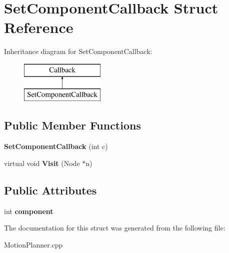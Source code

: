 \section{Set\+Component\+Callback Struct Reference}
\label{structSetComponentCallback}
Inheritance diagram for Set\+Component\+Callback\+:\begin{figure}[H]
\begin{center}
\leavevmode
\includegraphics[height=2.000000cm]{structSetComponentCallback}
\end{center}
\end{figure}
\subsection*{Public Member Functions}
\begin{DoxyCompactItemize}
\item 
{\bfseries Set\+Component\+Callback} (int c)\label{structSetComponentCallback_a0f2ca8f3081e1a3af4720d59f56df9fe}

\item 
virtual void {\bfseries Visit} (Node $\ast$n)\label{structSetComponentCallback_afd8b047454f94a9fc1983969ab7976fe}

\end{DoxyCompactItemize}
\subsection*{Public Attributes}
\begin{DoxyCompactItemize}
\item 
int {\bfseries component}\label{structSetComponentCallback_a544be9719b2ae2aedccf4aed117a6799}

\end{DoxyCompactItemize}


The documentation for this struct was generated from the following file\+:\begin{DoxyCompactItemize}
\item 
Motion\+Planner.\+cpp\end{DoxyCompactItemize}
